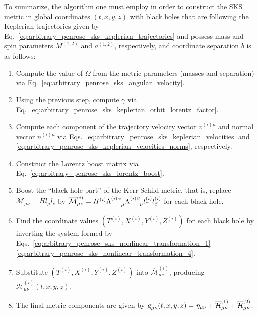 To summarize, the algorithm one must employ in order to construct the SKS metric in global coordinates $(t,x,y,z)$ with black holes that are following the Keplerian trajectories given by Eq.~\eqref{eq:arbitrary_penrose_sks_keplerian_trajectories} and possess mass and spin parameters $M^{(1,2)}$ and $a^{(1,2)}$, respectively, and coordinate separation $b$ is as follows:
%
\begin{enumerate}
  \item Compute the value of $\Omega$ from the metric parameters (masses and separation) via Eq.~\eqref{eq:arbitrary_penrose_sks_angular_velocity}.
  \item Using the previous step, compute $\gamma$ via Eq.~\eqref{eq:arbitrary_penrose_sks_keplerian_orbit_lorentz_factor}.
  \item Compute each component of the trajectory velocity vector $v^{(i) \mu}$ and normal vector $n^{(i) \mu}$ via Eqs.~\eqref{eq:arbitrary_penrose_sks_keplerian_velocities} and \eqref{eq:arbitrary_penrose_sks_keplerian_velocities_norms}, respectively.
  \item Construct the Lorentz boost matrix via Eq.~\eqref{eq:arbitrary_penrose_sks_lorentz_boost}.
  \item Boost the ``black hole part'' of the Kerr-Schild metric, that is, replace  $\mathcal{M}_{\mu\nu} = H l_\mu l_\nu$ by $\overline{\mathcal{M}}^{(i)}_{\mu\nu} = H^{(i)} \tens{\Lambda}{(i) \alpha}{\mu} \tens{\Lambda}{(i) \beta}{\nu} l^{(i)}_\alpha l^{(i)}_\beta$ for each black hole.
  \item Find the coordinate values $(T^{(i)}, X^{(i)}, Y^{(i)}, Z^{(i)})$ for each black hole by inverting the system formed by Eqs.~\eqref{eq:arbitrary_penrose_sks_nonlinear_transformation_1}-\eqref{eq:arbitrary_penrose_sks_nonlinear_transformation_4}.
  \item Substitute $(T^{(i)}, X^{(i)}, Y^{(i)}, Z^{(i)})$ into $\overline{\mathcal{M}}^{(i)}_{\mu\nu}$, producing $\overline{\mathcal{H}}^{(i)}_{\mu\nu}(t,x,y,z)$.
  \item The final metric components are given by $\mtrtens{\mu}{\nu}(t,x,y,z) = \eta_{\mu\nu} + \overline{\mathcal{H}}^{(1)}_{\mu\nu} + \overline{\mathcal{H}}^{(2)}_{\mu\nu}$.
\end{enumerate}


